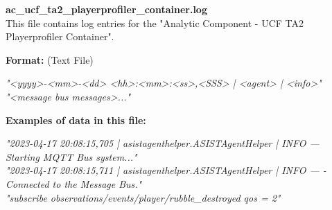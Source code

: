 \begin{description}
\begin{addmargin}[0em]{0em}
    \label{ac_ucf_ta2_playerprofiler_container.log}
    \begin{addmargin}[1em]{0em} %
        \textbf{ac\_ucf\_ta2\_playerprofiler\_container.log}\\
        This file contains log entries for the "Analytic Component - UCF TA2 Playerprofiler Container".
        \begin{addmargin}[1em]{0em}
            \textbf{Format:} (Text File)
            \begin{addmargin}[1em]{0em}
                \textit{"<yyyy>-<mm>-<dd> <hh>:<mm>:<ss>,<SSS> | <agent> | <info>"\\
                "<message bus messages>..."}
            \end{addmargin}
        \end{addmargin}
        \begin{addmargin}[1em]{0em}
            \textbf{Examples of data in this file:}
            \begin{addmargin}[1em]{0em}\textit{"2023-04-17 20:08:15,705 | asistagenthelper.ASISTAgentHelper | INFO — Starting MQTT Bus system..."\\
                "2023-04-17 20:08:15,711 | asistagenthelper.ASISTAgentHelper | INFO — - Connected to the Message Bus."\\
                "subscribe observations/events/player/rubble\_destroyed qos = 2"}
            \end{addmargin}
        \end{addmargin}
    \end{addmargin} %
    \textbf{\\}


\end{addmargin}
\end{description}
